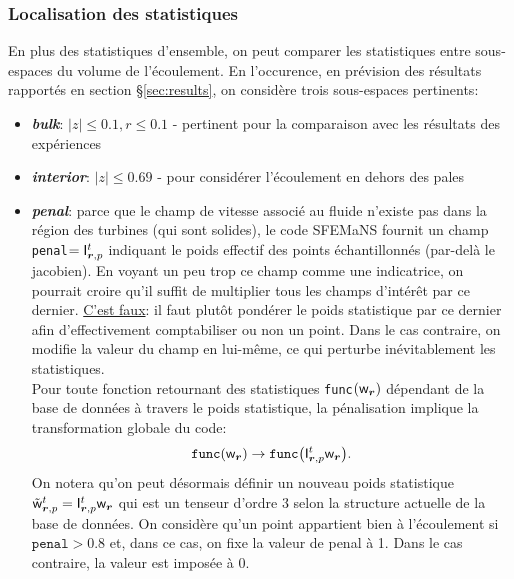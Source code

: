\documentclass[13pt, a4paper]{extarticle}
\begin{document}
\subsubsection{Localisation des statistiques}
\noindent En plus des statistiques d'ensemble, on peut comparer les statistiques 
entre sous-espaces du volume de l'écoulement. En l'occurence, en prévision des résultats
rapportés en section \S\ref{sec:results}, on considère trois sous-espaces pertinents:
\begin{itemize}
      \item {\bf \emph{bulk}}: $|z|\leq 0.1,r\leq 0.1$ - pertinent pour la comparaison
            avec les résultats des expériences
      \item {\bf \emph{interior}}: $|z|\leq 0.69$ - pour considérer l'écoulement en dehors
            des pales
      \item {\bf \emph{penal}}: \noindent parce que le champ de vitesse associé 
      au fluide n'existe pas dans la région des turbines (qui sont solides),
      le code SFEMaNS fournit un champ \texttt{penal}$=\mathsf{I}_{\boldsymbol{r},p}^t$ indiquant le poids effectif des
      points échantillonnés (par-delà le jacobien). En voyant un peu trop ce champ comme
      une indicatrice, on pourrait croire qu'il suffit de multiplier tous les champs
      d'intérêt par ce dernier. \underline{C'est faux}: il faut plutôt pondérer le poids
      statistique par ce dernier afin d'effectivement comptabiliser ou non un point. Dans
      le cas contraire, on modifie la valeur du champ en lui-même, ce qui perturbe inévitablement
      les statistiques. \\
      Pour toute fonction retournant des statistiques \texttt{func}$\qty(\mathsf{w}_{\boldsymbol{r}})$ 
      dépendant de la base de données à travers le poids statistique, la pénalisation
      implique la transformation globale du code:
      \begin{align}
          \texttt{func}\qty(\mathsf{w}_{\boldsymbol{r}}) \rightarrow \texttt{func}\qty(\mathsf{I}_{\boldsymbol{r},p}^t
                                              \mathsf{w}_{\boldsymbol{r}}).
      \end{align}
      On notera qu'on peut désormais définir un nouveau poids statistique $\tilde{\mathsf{w}}_{\boldsymbol{r},p}^t
      = \mathsf{I}_{\boldsymbol{r},p}^t\mathsf{w}_{\boldsymbol{r}}$ qui est un tenseur d'ordre 3 selon
      la structure actuelle de la base de données. On considère qu'un point
      appartient bien à l'écoulement si $\texttt{penal}>0.8$ et, dans ce cas, on fixe la valeur de penal
      à 1. Dans le cas contraire, la valeur est imposée à 0.
\end{itemize}
\end{document}

